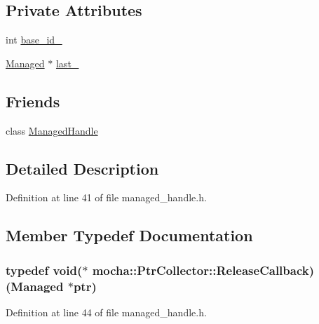 \subsection*{Private Attributes}
\begin{DoxyCompactItemize}
\item 
int \hyperlink{classmocha_1_1_ptr_collector_a2b40c7e0ba9f7e616ac2dfe227d35da7}{base\_\-id\_\-}
\item 
\hyperlink{classmocha_1_1_managed}{Managed} $\ast$ \hyperlink{classmocha_1_1_ptr_collector_aace5d19f242e09ab9f1cf71a97f91fa2}{last\_\-}
\end{DoxyCompactItemize}
\subsection*{Friends}
\begin{DoxyCompactItemize}
\item 
class \hyperlink{classmocha_1_1_ptr_collector_a102b7b383e0de8f3e612201cac01a458}{ManagedHandle}
\end{DoxyCompactItemize}


\subsection{Detailed Description}


Definition at line 41 of file managed\_\-handle.h.



\subsection{Member Typedef Documentation}
\hypertarget{classmocha_1_1_ptr_collector_a5ec1946ab80fe57d29680f29ef30abb1}{
\subsubsection[{ReleaseCallback}]{\setlength{\rightskip}{0pt plus 5cm}typedef void($\ast$  {\bf mocha::PtrCollector::ReleaseCallback})({\bf Managed} $\ast$ptr)}}
\label{classmocha_1_1_ptr_collector_a5ec1946ab80fe57d29680f29ef30abb1}


Definition at line 44 of file managed\_\-handle.h.




